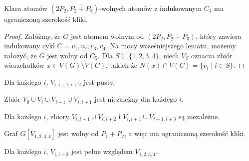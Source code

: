 \documentclass[polish]{beamer}
\begin{document}
\begin{frame}
    \begin{lemma}
        Klasa atomów $(2P_2, \overline{P_2 + P_3})$-wolnych atomów z indukowanym $C_4$ ma ograniczoną szerokość kliki.
    \end{lemma}
    \begin{proof}
        \renewcommand{\qedsymbol}{}
        Załóżmy, że $G$ jest atomem wolnym od $(2P_2, P_2 + P_3)$, który zawiera indukowany cykl $C = v_1, v_2, v_3, v_4$. Na mocy wcześniejszego lematu, możemy założyć, że $G$ jest wolny od $C_5$. Dla $S \subseteq \{1, 2, 3, 4\}$, niech $V_S$ oznacza zbiór wierzchołków $x \in V(G) \setminus V(C)$, takich że $N(x) \cap V(C) = \{v_i \mid i \in S\}$.
    \end{proof}
\end{frame}

\begin{frame}
    \begin{theorem}
        \renewcommand{\qedsymbol}{}
        Dla każdego $i$, $V_{i,i+1,i+2}$ jest pusty.
    \end{theorem}
    \graphSmaller
\end{frame}

\begin{frame}
    \begin{theorem}
        \renewcommand{\qedsymbol}{}
        Zbiór $V_\emptyset \cup V_i \cup V_{i+1} \cup V_{i,i+1}$ jest niezależny dla każdego $i$.
    \end{theorem}
    \graphSmaller
\end{frame}

\begin{frame}
    \begin{theorem}
        \renewcommand{\qedsymbol}{}
        Dla każdego $i$, zbiory $V_{i,i+1} \cup V_{i,i+2}$ i $V_{i,i+1} \cup V_{i+1,i+3}$ są niezależne.
    \end{theorem}
    \graphSmaller
\end{frame}

\begin{frame}
    \begin{theorem}
        \renewcommand{\qedsymbol}{}
        Graf $G[V_{1,2,3,4}]$ jest wolny od $P_1 + P_2$, a więc ma ograniczoną szerokość kliki.
        \end{theorem}
    \graphSmaller
\end{frame}

\begin{frame}
    \begin{theorem}
        \renewcommand{\qedsymbol}{}
        Dla każdego $i$, $V_{i,i+2}$ jest pełne względem $V_{1,2,3,4}$.
    \end{theorem}
    \graphSmaller
\end{frame}
\end{document}
